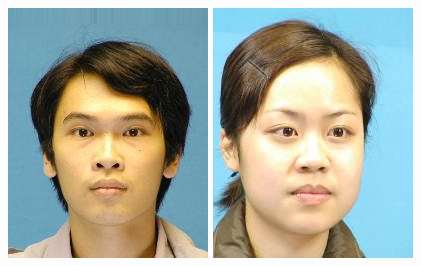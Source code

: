 \documentclass[10pt,twocolumn,letterpaper]{article}
\begin{document}
\begin{figure}[htbp]
{\begin{minipage}[b]{0.22\linewidth}
\includegraphics[width=0.99\linewidth]{img/light&pose_invariance/l2.jpg}
\includegraphics[width=0.99\linewidth]{img/light&pose_invariance/p1.jpg}

\end{minipage}}
\end{figure}
\end{document}
